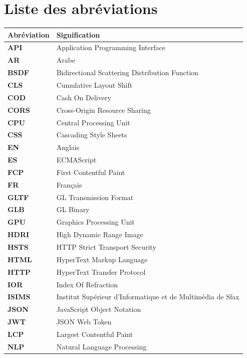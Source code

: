 \chapter*{Liste des abréviations}
\thispagestyle{plain}

\begin{longtable}{>{\bfseries\color{marron}}p{3cm} p{11cm}}
\toprule
\textbf{Abréviation} & \textbf{Signification} \\
\midrule
\endhead
API     & Application Programming Interface \\
AR      & Arabe \\
BSDF    & Bidirectional Scattering Distribution Function \\
CLS     & Cumulative Layout Shift \\
COD     & Cash On Delivery \\
CORS    & Cross-Origin Resource Sharing \\
CPU     & Central Processing Unit \\
CSS     & Cascading Style Sheets \\
EN      & Anglais \\
ES      & ECMAScript \\
FCP     & First Contentful Paint \\
FR      & Français \\
GLTF    & GL Transmission Format \\
GLB     & GL Binary \\
GPU     & Graphics Processing Unit \\
HDRI    & High Dynamic Range Image \\
HSTS    & HTTP Strict Transport Security \\
HTML    & HyperText Markup Language \\
HTTP    & HyperText Transfer Protocol \\
IOR     & Index Of Refraction \\
ISIMS   & Institut Supérieur d'Informatique et de Multimédia de Sfax \\
JSON    & JavaScript Object Notation \\
JWT     & JSON Web Token \\
LCP     & Largest Contentful Paint \\
NLP     & Natural Language Processing \\

\end{longtable}
